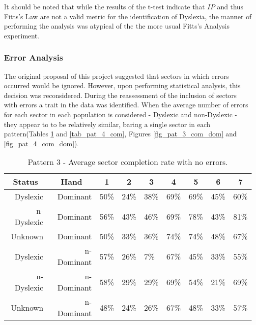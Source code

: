 		It should be noted that while the results of the t-test indicate that \(IP\) and thus Fitts’s Law are not a valid metric for the identification of Dyslexia, the manner of performing the analysis was atypical of the the more usual Fitts’s Analysis experiment.

	\subsubsection{Error Analysis}
		The original proposal of this project suggested that sectors in which errors occurred would be ignored. However, upon performing statistical analysis, this decision was reconsidered. During the reassessment of the inclusion of sectors with errors a trait in the data was identified. When the average number of errors for each sector in each population is considered - Dyslexic and non-Dyslexic - they appear to to be relatively similar, baring a single sector in each pattern(Tables \ref{tab_pat_3_com} and \ref{tab_pat_4_com}, Figures \ref{fig_pat_3_com_dom} and \ref{fig_pat_4_com_dom}).
					
		\begin{table}[h]
			\centering
			\caption{Pattern 3 - Average sector completion rate with no errors.}
			\label{tab_pat_3_com}
			\begin{tabularx}{\textwidth}{|r|r|X|X|X|X|X|X|X|}
				\hline
				\multicolumn{1}{|c|}{\textbf{Status}} & \multicolumn{1}{c|}{\textbf{Hand}} & \multicolumn{1}{c|}{\textbf{1}} & \multicolumn{1}{c|}{\textbf{2}} & \multicolumn{1}{c|}{\textbf{3}} & \multicolumn{1}{c|}{\textbf{4}} & \multicolumn{1}{c|}{\textbf{5}} & \multicolumn{1}{c|}{\textbf{6}} & \multicolumn{1}{c|}{\textbf{7}} \\ \hline
				Dyslexic                              & Dominant                           & 50\%       & 24\%       & 38\%       & 69\%       & 69\%       & 45\%       & 60\%       \\ \hline
				n-Dyslexic                          & Dominant                           & 56\%       & 43\%       & 46\%       & 69\%       & 78\%       & 43\%       & 81\%       \\ \hline
				Unknown                     & Dominant                           & 50\%       & 33\%       & 36\%       & 74\%       & 74\%       & 48\%       & 67\%       \\ \hline
				Dyslexic                              & n-Dominant                       & 57\%       & 26\%       & 7\%        & 67\%       & 45\%       & 33\%       & 55\%       \\ \hline
				n-Dyslexic                          & n-Dominant                       & 58\%       & 29\%       & 29\%       & 69\%       & 54\%       & 21\%       & 69\%       \\ \hline
				Unknown                    & n-Dominant                       & 48\%       & 24\%       & 26\%       & 67\%       & 48\%       & 33\%       & 57\%       \\ \hline
			\end{tabularx}
		\end{table}

